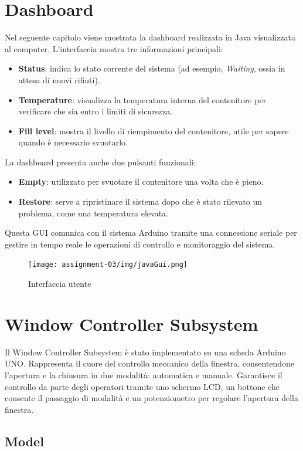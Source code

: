 \documentclass{report}
\begin{document}
\chapter{Dashboard}
Nel seguente capitolo viene mostrata la dashboard realizzata in Java visualizzata al computer. L'interfaccia mostra tre informazioni principali:
\begin{itemize}
    \item \textbf{Status}: indica lo stato corrente del sistema (ad esempio, \textit{Waiting}, ossia in attesa di nuovi rifiuti).
    \item \textbf{Temperature}: visualizza la temperatura interna del contenitore per verificare che sia entro i limiti di sicurezza.
    \item \textbf{Fill level}: mostra il livello di riempimento del contenitore, utile per sapere quando è necessario svuotarlo.
\end{itemize}
La dashboard presenta anche due pulsanti funzionali:
\begin{itemize}
    \item \textbf{Empty}: utilizzato per svuotare il contenitore una volta che è pieno.
    \item \textbf{Restore}: serve a ripristinare il sistema dopo che è stato rilevato un problema, come una temperatura elevata.
\end{itemize}
Questa GUI comunica con il sistema Arduino tramite una connessione seriale per gestire in tempo reale le operazioni di controllo e monitoraggio del sistema.
\begin{figure}[H]
    \centering
    \texttt{[image: assignment-03/img/javaGui.png]}
    \caption{Interfaccia utente}
    \label{fig:GUI}
\end{figure}


\chapter{Window Controller Subsystem}
\par {
Il Window Controller Subsystem è stato implementato su una scheda Arduino UNO. Rappresenta il cuore del controllo meccanico della finestra, consentendone l'apertura e la chiusura in due modalità: automatica e manuale. Garantisce il controllo da parte degli operatori tramite uno schermo LCD, un bottone che consente il passaggio di modalità e un potenziometro per regolare l'apertura della finestra.
}

\section{Model}
\end{document}
